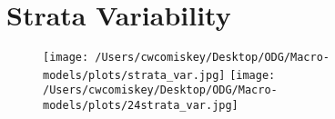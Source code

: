 \documentclass{article}
\begin{document}
\section*{Strata Variability}
    \begin{figure}[H]
    \centering
    \texttt{[image: /Users/cwcomiskey/Desktop/ODG/Macro-models/plots/strata\_var.jpg]}
    \texttt{[image: /Users/cwcomiskey/Desktop/ODG/Macro-models/plots/24strata\_var.jpg]}
    \end{figure}
\end{document}
